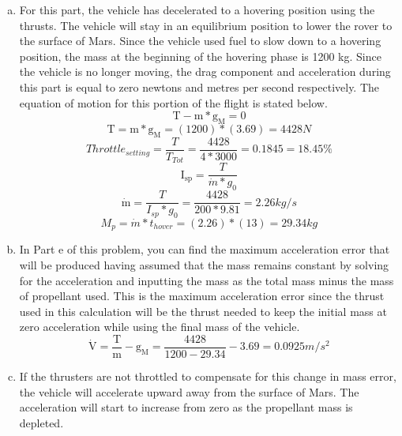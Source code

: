 \begin{enumerate}[a.]
\item
For this part, the vehicle has decelerated to a hovering position using the thrusts. The vehicle will stay in an equilibrium position to lower the rover to the surface of Mars. Since the vehicle used fuel to slow down to a hovering position, the mass at the beginning of the hovering phase is 1200 kg. Since the vehicle is no longer moving, the drag component and acceleration during this part is equal to zero newtons and metres per second respectively. The equation of motion for this portion of the flight is stated below.\\
\begin{equation}
\mathrm{T}-\mathrm{m*g_M}=0
\end{equation}
\begin{equation}
\mathrm{T}=\mathrm{m*g_M}=(1200)*(3.69)=4428 N
\end{equation}
\begin{equation}
Throttle_{setting}=\frac{T}{T_{Tot}}=\frac{4428}{4*3000}=0.1845=18.45\%
\end{equation}
\begin{equation}
\mathrm{I_{sp}}=\frac{T}{\dot{m}*g_0}
\end{equation}
\begin{equation}
\mathrm{\dot{m}}=\frac{T}{I_{sp}*g_0}=\frac{4428}{200*9.81}=2.26kg/s
\end{equation}
\begin{equation}
M_p=\dot{m}*t_{hover}=(2.26)*(13)=29.34 kg
\end{equation}

\item
In Part e of this problem, you can find the maximum acceleration error that will be produced having assumed that the mass remains constant by solving for the acceleration and inputting the mass as the total mass minus the mass of propellant used. This is the maximum acceleration error since the thrust used in this calculation will be the thrust needed to keep the initial mass at zero acceleration while using the final mass of the vehicle.
\begin{equation}
\dot{\mathrm{V}}=\frac{\mathrm{T}}{\mathrm{m}}-\mathrm{g_M}=\frac{\mathrm{4428}}{\mathrm{1200-29.34}}-\mathrm{3.69}=0.0925m/s^2
\end{equation}


\item
If the thrusters are not throttled to compensate for this change in mass error, the vehicle will accelerate upward away from the surface of Mars. The acceleration will start to increase from zero as the propellant mass is depleted.
\end{enumerate}